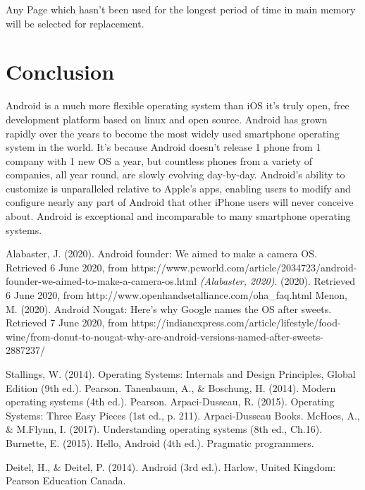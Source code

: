 \documentclass[preprint,12pt]{elsarticle}
\begin{document}
Any Page which hasn't been used for the longest period of time in main memory will be selected for replacement.
\section{Conclusion}
Android is a much more flexible operating system than iOS  it's truly open, free development platform based on linux and open source. Android has grown rapidly over the years to become the most widely used smartphone operating system in the world. It's because Android doesn't release 1 phone from 1 company with 1 new OS a year, but countless phones from a variety of companies, all year round, are slowly evolving day-by-day. Android's ability to customize is unparalleled relative to Apple's apps, enabling users to modify and configure nearly any part of Android that other iPhone users will never conceive about. Android is exceptional and incomparable to many smartphone operating systems.




\begin{thebibliography}{10}
Alabaster, J. (2020). Android founder: We aimed to make a camera OS. Retrieved 6 June 2020, from https://www.pcworld.com/article/2034723/android-founder-we-aimed-to-make-a-camera-os.html
\textit{(Alabaster, 2020)}. 
(2020). Retrieved 6 June 2020, from http://www.openhandsetalliance.com/oha\_faq.html
Menon, M. (2020). Android Nougat: Here’s why Google names the OS after sweets. Retrieved 7 June 2020, from https://indianexpress.com/article/lifestyle/food-wine/from-donut-to-nougat-why-are-android-versions-named-after-sweets-2887237/

Stallings, W. (2014). Operating Systems: Internals and Design Principles, Global Edition (9th ed.). Pearson.
Tanenbaum, A., \& Boschung, H. (2014). Modern operating systems (4th ed.). Pearson.
Arpaci-Dusseau, R. (2015). Operating Systems: Three Easy Pieces (1st ed., p. 211). Arpaci-Dusseau Books.
McHoes, A., \& M.Flynn, I. (2017). Understanding operating systems (8th ed., Ch.16).
Burnette, E. (2015). Hello, Android (4th ed.). Pragmatic programmers.

Deitel, H., \& Deitel, P. (2014). Android (3rd ed.). Harlow, United Kingdom: Pearson Education Canada.


\end{thebibliography}
\end{document}
